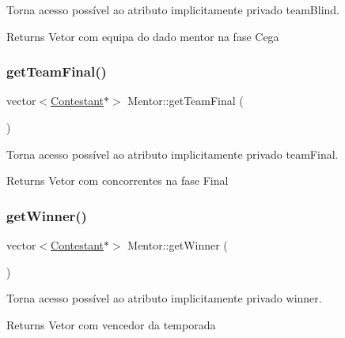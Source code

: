 Torna acesso possível ao atributo implicitamente privado team\+Blind. 

\begin{DoxyReturn}{Returns}
Vetor com equipa do dado mentor na fase Cega 
\end{DoxyReturn}
\hypertarget{class_mentor_aab229229a4b59ed74cb10a09550382e4}{}\label{class_mentor_aab229229a4b59ed74cb10a09550382e4} 
\subsubsection{\texorpdfstring{get\+Team\+Final()}{getTeamFinal()}}
{\footnotesize\ttfamily vector$<$\hyperlink{class_contestant}{Contestant}$\ast$$>$ Mentor\+::get\+Team\+Final (\begin{DoxyParamCaption}{ }\end{DoxyParamCaption})\hspace{0.3cm}{\ttfamily [inline]}}



Torna acesso possível ao atributo implicitamente privado team\+Final. 

\begin{DoxyReturn}{Returns}
Vetor com concorrentes na fase Final 
\end{DoxyReturn}
\hypertarget{class_mentor_ac05f8106cb7946dd13d3c3efafb4c3d2}{}\label{class_mentor_ac05f8106cb7946dd13d3c3efafb4c3d2} 
\subsubsection{\texorpdfstring{get\+Winner()}{getWinner()}}
{\footnotesize\ttfamily vector$<$\hyperlink{class_contestant}{Contestant}$\ast$$>$ Mentor\+::get\+Winner (\begin{DoxyParamCaption}{ }\end{DoxyParamCaption})\hspace{0.3cm}{\ttfamily [inline]}}



Torna acesso possível ao atributo implicitamente privado winner. 

\begin{DoxyReturn}{Returns}
Vetor com vencedor da temporada 
\end{DoxyReturn}
\hypertarget{class_mentor_a07a8359f559b44a2fac24726f19e6dfb}{}\label{class_mentor_a07a8359f559b44a2fac24726f19e6dfb} 
